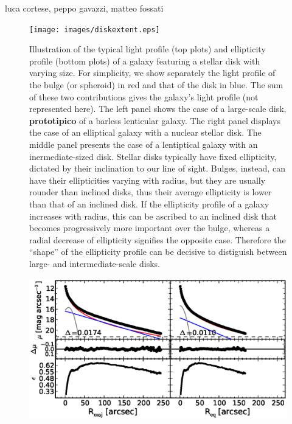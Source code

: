 \documentclass[12pt,preprint]{nature}
\begin{document}
luca cortese, peppo gavazzi, matteo fossati
\begin{figure}
\texttt{[image: images/diskextent.eps]}
\caption{Illustration of the typical light profile (top plots) and ellipticity profile (bottom plots) of a galaxy 
featuring a stellar disk with varying size. 
For simplicity, we show separately the light profile of the bulge (or spheroid) in red 
and that of the disk in blue. 
The sum of these two contributions gives the galaxy's light profile (not represented here).
The left panel shows the case of a large-scale disk, {\bf prototipico} of a barless lenticular galaxy. 
The right panel displays the case of an elliptical galaxy with a nuclear stellar disk. 
The middle panel presents the case of a lentiptical galaxy with an inermediate-sized disk. 
Stellar disks typically have fixed ellipticity, dictated by their inclination to our line of sight.
Bulges, instead, can have their ellipticities varying with radius,
but they are usually rounder than inclined disks, 
thus their average ellipticity is lower than that of an inclined disk.
If the ellipticity profile of a galaxy increases with radius, 
this can be ascribed to an inclined disk that becomes progressively more important over the bulge,
whereas a radial decrease of ellipticity signifies the opposite case. 
Therefore the ``shape'' of the ellipticity profile can be decisive to distiguish between 
large- and intermediate-scale disks. 
}
\label{fig:ellp}
\end{figure}

\begin{figure}
\includegraphics[width=\columnwidth]{images/n3115_decomposition.eps}
\caption{
}
\label{fig:n3115}
\end{figure}
\end{document}
